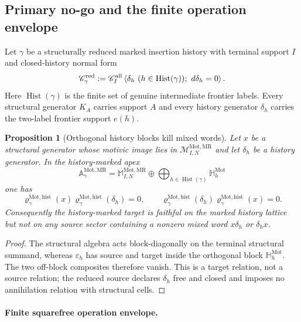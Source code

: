 \documentclass[11pt]{article}
\newtheorem{proposition}[theorem]{Proposition}
\theoremstyle{remark}
\newcommand{\Mot}{\mathrm{Mot}}
\newcommand{\MR}{\mathrm{MR}}
\begin{document}
\subsection{Primary no-go and the finite operation envelope}

Let $\gamma$ be a structurally reduced marked insertion history with terminal
support $I$ and closed-history normal form
\begin{equation}
 \mathscr C_{\gamma}^{\rm red}
 :=\mathscr C_I^{\rm all}
   \left\langle \delta_h\ (h\in\operatorname{Hist}(\gamma));\ d\delta_h=0\right\rangle .
\end{equation}
Here $\operatorname{Hist}(\gamma)$ is the finite set of genuine intermediate frontier labels.
Every structural generator $K_A$ carries support $A$ and every history generator
$\delta_h$ carries the two-label frontier support $e(h)$.

\begin{proposition}[Orthogonal history blocks kill mixed words]
\label{P2M-prop:v22-orthogonal-mixed-word-nogo}
Let $x$ be a structural generator whose motivic image lies in
$\mathscr M_{I,N}^{\Mot,\MR}$ and let $\delta_h$ be a history generator.  In the
history-marked apex
\[
 \mathbb A_{\gamma}^{\Mot,\MR}
 =\mathbb M_{I,N}^{\Mot,\MR}
  \oplus\bigoplus_{h\in\operatorname{Hist}(\gamma)}\mathbb H_h^{\Mot}
\]
one has
\begin{equation}
 \boxed{
 \varrho_{\gamma}^{\Mot,\mathrm{hist}}(x)
 \varrho_{\gamma}^{\Mot,\mathrm{hist}}(\delta_h)=0,
 \qquad
 \varrho_{\gamma}^{\Mot,\mathrm{hist}}(\delta_h)
 \varrho_{\gamma}^{\Mot,\mathrm{hist}}(x)=0.}
\end{equation}
Consequently the history-marked target is faithful on the marked history lattice but not
on any source sector containing a nonzero mixed word $x\delta_h$ or
$\delta_hx$.
\end{proposition}

\begin{proof}
The structural algebra acts block-diagonally on the terminal structural summand,
whereas $\varepsilon_h$ has source and target inside the orthogonal block
$\mathbb H_h^{\Mot}$.  The two off-block composites therefore vanish.  This is
a target relation, not a source relation; the reduced source declares
$\delta_h$ free and closed and imposes no annihilation relation with structural
cells.
\end{proof}

\paragraph{Finite squarefree operation envelope.}
\end{document}
